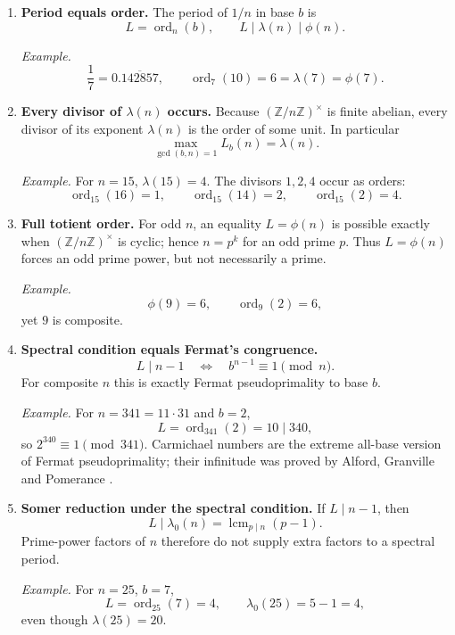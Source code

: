 \documentclass[11pt]{article}
\newcommand{\ord}{\operatorname{ord}}
\begin{document}
\begin{enumerate}[label=\textbf{T\arabic*.},leftmargin=2.2em]
\item \textbf{Period equals order.}
The period of $1/n$ in base $b$ is
\[
L=\ord_n(b),
\qquad
L\mid\lambda(n)\mid\phi(n).
\]

\smallskip
\noindent\emph{Example.}
\[
\frac17=0.\overline{142857},
\qquad
\ord_7(10)=6=\lambda(7)=\phi(7).
\]

\item \textbf{Every divisor of $\lambda(n)$ occurs.}
Because $(\mathbb Z/n\mathbb Z)^\times$ is finite abelian, every divisor of
its exponent $\lambda(n)$ is the order of some unit.  In particular
\[
\max_{\gcd(b,n)=1}L_b(n)=\lambda(n).
\]

\smallskip
\noindent\emph{Example.}
For $n=15$, $\lambda(15)=4$.  The divisors $1,2,4$ occur as orders:
\[
\ord_{15}(16)=1,\qquad
\ord_{15}(14)=2,\qquad
\ord_{15}(2)=4.
\]

\item \textbf{Full totient order.}
For odd $n$, an equality $L=\phi(n)$ is possible exactly when
$(\mathbb Z/n\mathbb Z)^\times$ is cyclic; hence $n=p^k$ for an odd prime
$p$.  Thus $L=\phi(n)$ forces an odd prime power, but not necessarily a
prime.

\smallskip
\noindent\emph{Example.}
\[
\phi(9)=6,\qquad \ord_9(2)=6,
\]
yet $9$ is composite.

\item \textbf{Spectral condition equals Fermat's congruence.}
\[
L\mid n-1
\quad\Longleftrightarrow\quad
b^{n-1}\equiv1\pmod n.
\]
For composite $n$ this is exactly Fermat pseudoprimality to base $b$.

\smallskip
\noindent\emph{Example.}
For $n=341=11\cdot31$ and $b=2$,
\[
L=\ord_{341}(2)=10\mid340,
\]
so $2^{340}\equiv1\pmod{341}$.
Carmichael numbers are the extreme all-base version of Fermat pseudoprimality;
their infinitude was proved by Alford, Granville and Pomerance
\cite{AGP1994}.

\item \textbf{Somer reduction under the spectral condition.}
If $L\mid n-1$, then
\[
L\mid\lambda_0(n)=\operatorname{lcm}_{p\mid n}(p-1).
\]
Prime-power factors of $n$ therefore do not supply extra factors to a
spectral period.

\smallskip
\noindent\emph{Example.}
For $n=25$, $b=7$,
\[
L=\ord_{25}(7)=4,
\qquad
\lambda_0(25)=5-1=4,
\]
even though $\lambda(25)=20$.
\end{enumerate}
\end{document}

